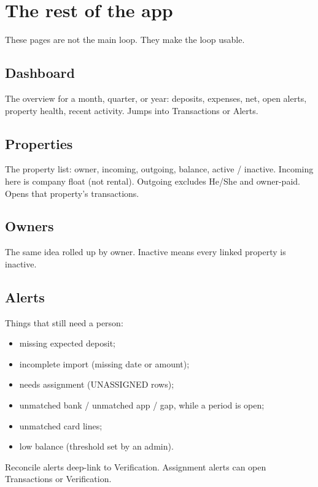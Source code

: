 \documentclass[11pt,a4paper]{article}
\begin{document}
\section{The rest of the app}

These pages are not the main loop.
They make the loop usable.

\subsection{Dashboard}

The overview for a month, quarter, or year:
deposits, expenses, net, open alerts, property health, recent activity.
Jumps into Transactions or Alerts.

\subsection{Properties}

The property list: owner, incoming, outgoing, balance, active / inactive.
Incoming here is company float (not rental).
Outgoing excludes He/She and owner-paid.
Opens that property's transactions.

\subsection{Owners}

The same idea rolled up by owner.
Inactive means every linked property is inactive.

\subsection{Alerts}

Things that still need a person:
\begin{itemize}
  \item missing expected deposit;
  \item incomplete import (missing date or amount);
  \item needs assignment (UNASSIGNED rows);
  \item unmatched bank / unmatched app / gap, while a period is open;
  \item unmatched card lines;
  \item low balance (threshold set by an admin).
\end{itemize}

Reconcile alerts deep-link to Verification.
Assignment alerts can open Transactions or Verification.
\end{document}
